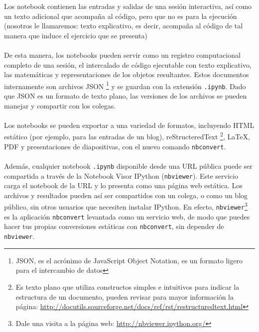 \documentclass[12pt]{article}
\begin{document}
Los notebook contienen las entradas y salidas de una sesión interactiva, así como un texto adicional que acompaña al código, pero que no es para la ejecución (nosotros le llamaremos: texto explicativo, es decir, acompaña al código de tal manera que induce el ejercicio que se presenta)
\\
\\
De esta manera, los notebooks pueden servir como un registro computacional completo de una sesión, el intercalado de código ejecutable con texto explicativo, las matemáticas y representaciones de los objetos resultantes. Estos documentos internamente son archivos JSON \footnote{JSON, es el acrónimo de JavaScript Object Notation, es un formato ligero para el intercambio de datos} y se guardan con la extensión \texttt{.ipynb}. Dado que JSON es un formato de texto plano, las versiones de los archivos se pueden manejar y compartir con los colegas. 
\\
\\
Los notebooks se pueden exportar a una variedad de formatos, incluyendo HTML estático (por ejemplo, para las entradas de un blog), reStructeredText \footnote{Es texto plano que utiliza constructos simples e intuitivos para indicar la estructura de un documento, pueden revisar para mayor información la página: \url{http://docutils.sourceforge.net/docs/ref/rst/restructuredtext.html}}, \LaTeX, PDF y presentaciones de diapositivas, con el nuevo comando \texttt{nbconvert}. 
\\
\\
Además, cualquier notebook \texttt{.ipynb} disponible desde una URL pública puede ser compartida a través de la Notebook Visor IPython (\texttt{nbviewer}). Este servicio carga el notebook de la URL y lo presenta como una página web estática. Los archivos y resultados pueden así ser compartidos con un colega, o como un blog público, sin otros usuarios que necesiten instalar IPython. En efecto, \texttt{nbviewer}\footnote{Dale una visita a la página web: \url{http://nbviewer.ipython.org/}} es la aplicación \texttt{nbconvert} levantada como un servicio web, de modo que puedes hacer tus propias conversiones estáticas con \texttt{nbconvert}, sin depender de \texttt{nbviewer}.
\end{document}
